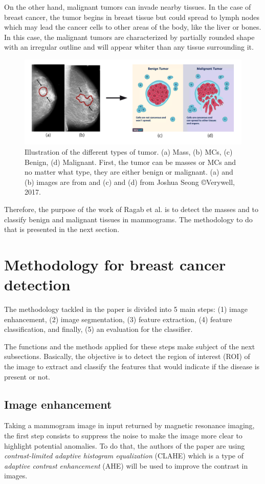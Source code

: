 \documentclass[11pt, openany]{report}
\theoremstyle{plain}
\theoremstyle{definition}
\theoremstyle{remark}
\begin{document}
On the other hand, malignant tumors can invade nearby tissues. In the case of breast cancer, the tumor begins in breast tissue but could spread to lymph nodes which may lead the cancer cells to other areas of the body, like the liver or bones. In this case, the malignant tumors are characterized by partially rounded shape with an irregular outline and will appear whiter than any tissue surrounding it.

\begin{figure}[h]
  \centering
  \includegraphics[scale=0.28]{figures/tumor-types.png}
  \caption{Illustration of the different types of tumor. (a) Mass, (b) MCs, (c) Benign, (d) Malignant. First, the tumor can be masses or MCs and no matter what type, they are either benign or malignant. (a) and (b) images are from \cite{breast-cancer} and (c) and (d) from Joshua Seong \copyright Verywell, 2017.}
  \label{fig:tumor-types}
\end{figure}

Therefore, the purpose of the work of Ragab et al. \cite{breast-cancer} is to detect the masses and to classify benign and malignant tissues in mammograms. The methodology to do that is presented in the next section.  

\section{Methodology for breast cancer detection}
The methodology tackled in the paper \cite{breast-cancer} is divided into 5 main steps: (1) image enhancement, (2) image segmentation, (3) feature extraction, (4) feature classification, and finally, (5) an evaluation for the classifier. 

The functions and the methods applied for these steps make subject of the next subsections. Basically, the objective is to detect the region of interest (ROI) of the image to extract and classify the features that would indicate if the disease is present or not. 

\subsection{Image enhancement}
Taking a mammogram image in input returned by magnetic resonance imaging, the first step consists to suppress the noise to make the image more clear to highlight potential anomalies. To do that, the authors of the paper are using \textit{contrast-limited adaptive histogram equalization} (CLAHE) which is a type of \textit{adaptive contrast enhancement} (AHE) will be used to improve the contrast in images.  
\end{document}
